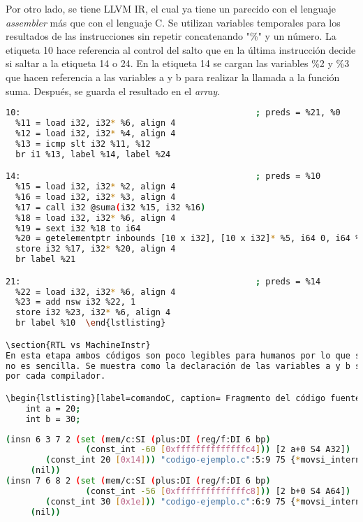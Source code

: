 Por otro lado, se tiene LLVM IR, el cual ya tiene un parecido con el lenguaje \emph{assembler} 
más que con el lenguaje C. Se utilizan variables temporales para los resultados de las 
instrucciones sin repetir concatenando "\%" y un número. La etiqueta 10 hace referencia 
al control del salto que en la última instrucción decide si saltar a la etiqueta 14 o 24. 
En la etiqueta 14 se cargan las variables \%2 y \%3 que hacen referencia a las variables 
a y b para realizar la llamada a la función suma. Después, se guarda el resultado en 
el \emph{array}.

\begin{lstlisting}[label=comandoC, caption= Fragmento del LLVM IR de CLANG/LLVM del archivo llvm-ir.ll. \cite{repositorio}, language=bash]
10:                                               ; preds = %21, %0
  %11 = load i32, i32* %6, align 4
  %12 = load i32, i32* %4, align 4
  %13 = icmp slt i32 %11, %12
  br i1 %13, label %14, label %24

14:                                               ; preds = %10
  %15 = load i32, i32* %2, align 4
  %16 = load i32, i32* %3, align 4
  %17 = call i32 @suma(i32 %15, i32 %16)
  %18 = load i32, i32* %6, align 4
  %19 = sext i32 %18 to i64
  %20 = getelementptr inbounds [10 x i32], [10 x i32]* %5, i64 0, i64 %19
  store i32 %17, i32* %20, align 4
  br label %21

21:                                               ; preds = %14
  %22 = load i32, i32* %6, align 4
  %23 = add nsw i32 %22, 1
  store i32 %23, i32* %6, align 4
  br label %10  \end{lstlisting}

\section{RTL vs MachineInstr}
En esta etapa ambos códigos son poco legibles para humanos por lo que su descripción 
no es sencilla. Se muestra como la declaración de las variables a y b son expresadas 
por cada compilador. 

\begin{lstlisting}[label=comandoC, caption= Fragmento del código fuente del archivo codigo-ejemplo.c. \cite{repositorio}, language=bash]
    int a = 20;
    int b = 30; \end{lstlisting}

\begin{lstlisting}[label=comandoC, caption= Fragmento de RTL de GCC del archivo codigo-ejemplo.c.330r.final. \cite{repositorio}, language=bash]
(insn 6 3 7 2 (set (mem/c:SI (plus:DI (reg/f:DI 6 bp)
                (const_int -60 [0xffffffffffffffc4])) [2 a+0 S4 A32])
        (const_int 20 [0x14])) "codigo-ejemplo.c":5:9 75 {*movsi_internal}
     (nil))
(insn 7 6 8 2 (set (mem/c:SI (plus:DI (reg/f:DI 6 bp)
                (const_int -56 [0xffffffffffffffc8])) [2 b+0 S4 A64])
        (const_int 30 [0x1e])) "codigo-ejemplo.c":6:9 75 {*movsi_internal}
     (nil)) \end{lstlisting}

